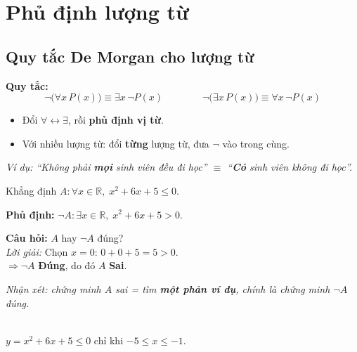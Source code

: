 \documentclass[12pt,a4paper]{article}
\begin{document}
\section{Phủ định lượng từ}

\subsection{Quy tắc De Morgan cho lượng từ}

\textbf{Quy tắc:}
\[
  \neg\big(\forall x\, P(x)\big) \equiv \exists x\,\neg P(x) \qquad\qquad \neg\big(\exists x\, P(x)\big) \equiv \forall x\,\neg P(x)
\]
\begin{itemize}
  \item Đổi $\forall \longleftrightarrow \exists$, rồi \textbf{phủ định vị từ}.
  \item Với nhiều lượng từ: đổi \textbf{từng} lượng từ, đưa $\neg$ vào trong cùng.
\end{itemize}
\textit{Ví dụ: ``Không phải \textbf{mọi} sinh viên đều đi học'' $\equiv$ ``\textbf{Có} sinh viên không đi học''.}

\vspace{6pt}
\noindent
\begin{minipage}[c]{0.55\textwidth}
Khẳng định $A : \forall x \in \mathbb{R},\; x^2 + 6x + 5 \le 0$.

\textbf{Phủ định:} $\neg A : \exists x \in \mathbb{R},\; x^2 + 6x + 5 > 0$.

\textbf{Câu hỏi:} $A$ hay $\neg A$ đúng?\\
\textit{Lời giải:} Chọn $x = 0$: $0 + 0 + 5 = 5 > 0$.\\
$\Rightarrow \neg A$ \textcolor{AccentGreen}{\textbf{Đúng}}, do đó $A$ \textcolor{AccentRed}{\textbf{Sai}}.

\vspace{4pt}
\textit{Nhận xét: chứng minh $A$ sai = tìm \textbf{một phản ví dụ}, chính là chứng minh $\neg A$ đúng.}
\end{minipage}
\hfill
\begin{minipage}[c]{0.42\textwidth}
\centering
{}\\[2pt]
{\footnotesize $y = x^2 + 6x + 5 \le 0$ chỉ khi $-5 \le x \le -1$.}
\end{minipage}
\end{document}
